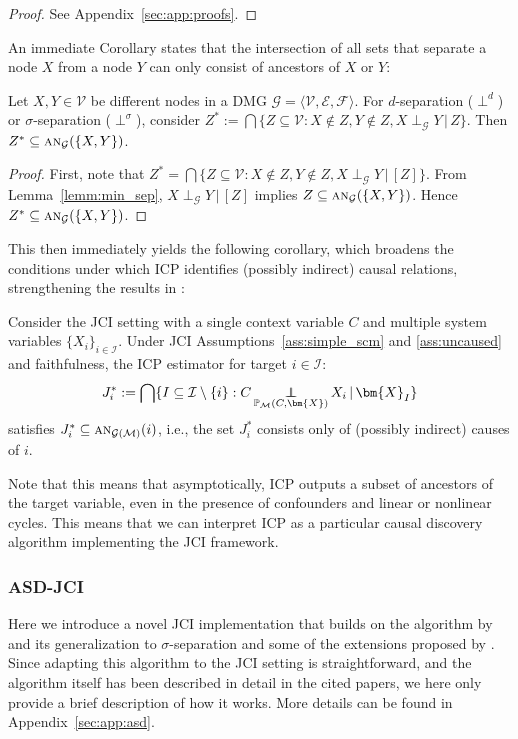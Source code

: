\documentclass[twoside,11pt]{article}
\DeclareMathOperator*{\CI}{{\,\perp\mkern-12mu\perp\,}}
\DeclareMathOperator*{\SEP}{\perp}
\newcommand\indep[4]{{#1} \CI_{#4} {#2} \given {#3}}
\newcommand\sep[4]{{#1} \SEP_{#4} {#2} \given {#3}}
\newcommand{\Prb}{\mathbb{P}}
\newcommand\B[1]{\bm{#1}}
\newcommand\C[1]{\mathcal{#1}}
\newcommand\mathbfsc[1]{\text{\normalfont\scshape#1}}
\newcommand\ansub[2]{\mathbfsc{an}_{#1}(#2)}
\newcommand\given{\,|\,}
\begin{document}
\begin{proof}
  See Appendix~\ref{sec:app:proofs}.
\end{proof}
An immediate Corollary states that the intersection of all sets that separate a node $X$ from a node $Y$ can only consist of ancestors of $X$ or $Y$:
\begin{proposition}
Let $X,Y \in \C{V}$ be different nodes in a DMG $\C{G} = \langle \C{V},\C{E},\C{F} \rangle$.
For $d$-separation ($\SEP^d$) or $\sigma$-separation ($\SEP^\sigma$), consider
  $Z^* := \bigcap \{Z \subseteq \C{V} : X \notin Z, Y \notin Z, \sep{X}{Y}{Z}{\C{G}}\}$. 
Then $Z^* \subseteq \ansub{\C{G}}{\{X,Y\}}$.
\end{proposition}
\begin{proof}
First, note that
  $Z^* = \bigcap \{Z \subseteq \C{V} : X \notin Z, Y \notin Z, \sep{X}{Y}{[Z]}{\C{G}}\}$. From Lemma~\ref{lemm:min_sep}, $\sep{X}{Y}{[Z]}{\C{G}}$ implies $Z \subseteq \ansub{\C{G}}{\{X,Y\}}$. Hence $Z^* \subseteq \ansub{\C{G}}{\{X,Y\}}$.
\end{proof}
This then immediately yields
the following corollary, which broadens the conditions under which ICP identifies (possibly indirect) causal relations,
strengthening the results in \citet{ICP2016}:
\begin{corollary}\label{cor:ICP_as_JCI}
Consider the JCI setting with a single context variable $C$ and multiple system variables
$\{X_i\}_{i\in\C{I}}$. Under JCI Assumptions~\ref{ass:simple_scm} and \ref{ass:uncaused} and faithfulness,
the ICP estimator for target $i \in \C{I}$:
$$J_i^* := \bigcap \{I \subseteq \C{I} \setminus \{i\}: \indep{C}{X_i}{\B{X}_I}{\Prb_{\C{M}}(C,\B{X})} \}$$
satisfies $J_i^* \subseteq \ansub{\C{G}(\C{M})}{i}$, i.e., the set $J_i^*$ consists only of (possibly indirect) causes of $i$.
\end{corollary}
Note that this means that asymptotically, ICP outputs a subset of ancestors of the target variable, 
even in the presence of confounders and linear or nonlinear cycles.
This means that we can interpret ICP as a particular causal discovery algorithm implementing the JCI framework.


\subsubsection{ASD-JCI}

Here we introduce a novel JCI implementation that builds on the algorithm by \citet{HEJ2014} and its generalization to $\sigma$-separation \citep{ForreMooij_UAI_18} and some of the extensions proposed by \citet{MagliacaneClaassenMooij_NIPS_16}. 
Since adapting this algorithm to the JCI setting is straightforward, and the algorithm itself has been described in detail in the cited papers, we here only provide a brief description of how it works. 
More details can be found in Appendix~\ref{sec:app:asd}.
\end{document}
